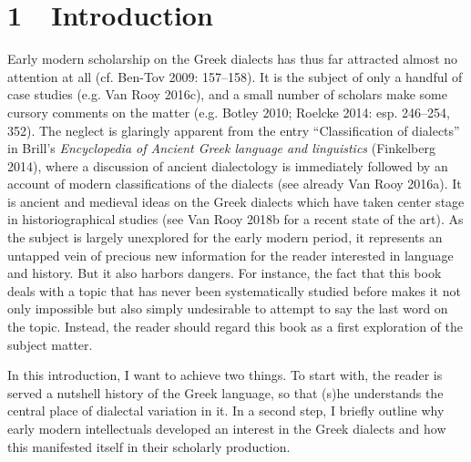 \clearpage\section[1\ \ Introduction]{1\ \ Introduction}
\hypertarget{Toc19704802}{}\begin{styleStandard}
Early modern scholarship on the Greek dialects has thus far attracted almost no attention at all (cf. Ben-Tov 2009: 157–158). It is the subject of only a handful of case studies (e.g. Van Rooy 2016c), and a small number of scholars make some cursory comments on the matter (e.g. Botley 2010; Roelcke 2014: esp. 246–254, 352). The neglect is glaringly apparent from the entry “Classification of dialects” in Brill’s \textit{Encyclopedia of Ancient Greek language and linguistics} (Finkelberg 2014), where a discussion of ancient dialectology is immediately followed by an account of modern classifications of the dialects (see already Van Rooy 2016a). It is ancient and medieval ideas on the Greek dialects which have taken center stage in historiographical studies (see Van Rooy 2018b for a recent state of the art). As the subject is largely unexplored for the early modern period, it represents an untapped vein of precious new information for the reader interested in language and history. But it also harbors dangers. For instance, the fact that this book deals with a topic that has never been systematically studied before makes it not only impossible but also simply undesirable to attempt to say the last word on the topic. Instead, the reader should regard this book as a first exploration of the subject matter.
\end{styleStandard}

\begin{styleStandard}
In this introduction, I want to achieve two things. To start with, the reader is served a nutshell history of the Greek language, so that (s)he understands the central place of dialectal variation in it. In a second step, I briefly outline why early modern intellectuals developed an interest in the Greek dialects and how this manifested itself in their scholarly production.
\end{styleStandard}

